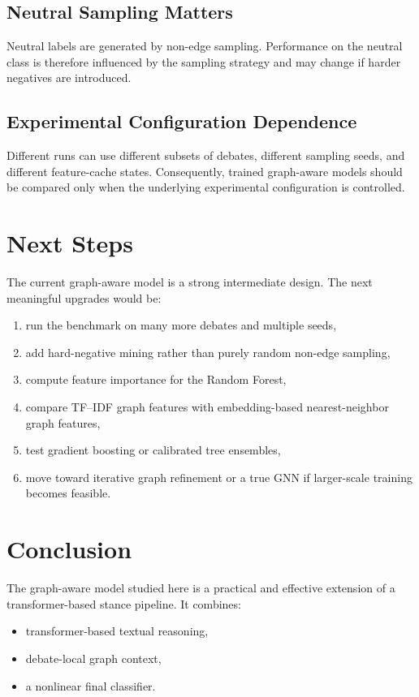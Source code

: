 \documentclass[11pt,a4paper]{article}
\begin{document}
\subsection{Neutral Sampling Matters}
Neutral labels are generated by non-edge sampling. Performance on the neutral class is therefore influenced by the sampling strategy and may change if harder negatives are introduced.

\subsection{Experimental Configuration Dependence}
Different runs can use different subsets of debates, different sampling seeds, and different feature-cache states. Consequently, trained graph-aware models should be compared only when the underlying experimental configuration is controlled.

\section{Next Steps}
The current graph-aware model is a strong intermediate design. The next meaningful upgrades would be:
\begin{enumerate}[label=\arabic*.]
  \item run the benchmark on many more debates and multiple seeds,
  \item add hard-negative mining rather than purely random non-edge sampling,
  \item compute feature importance for the Random Forest,
  \item compare TF--IDF graph features with embedding-based nearest-neighbor graph features,
  \item test gradient boosting or calibrated tree ensembles,
  \item move toward iterative graph refinement or a true GNN if larger-scale training becomes feasible.
\end{enumerate}

\section{Conclusion}
The graph-aware model studied here is a practical and effective extension of a transformer-based stance pipeline. It combines:
\begin{itemize}[leftmargin=1.5em]
  \item transformer-based textual reasoning,
  \item debate-local graph context,
  \item a nonlinear final classifier.
\end{itemize}
\end{document}
